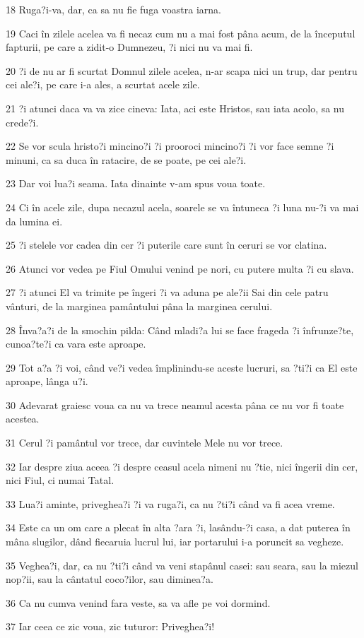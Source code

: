 \par 18 Ruga?i-va, dar, ca sa nu fie fuga voastra iarna.
\par 19 Caci în zilele acelea va fi necaz cum nu a mai fost pâna acum, de la începutul fapturii, pe care a zidit-o Dumnezeu, ?i nici nu va mai fi.
\par 20 ?i de nu ar fi scurtat Domnul zilele acelea, n-ar scapa nici un trup, dar pentru cei ale?i, pe care i-a ales, a scurtat acele zile.
\par 21 ?i atunci daca va va zice cineva: Iata, aci este Hristos, sau iata acolo, sa nu crede?i.
\par 22 Se vor scula hristo?i mincino?i ?i prooroci mincino?i ?i vor face semne ?i minuni, ca sa duca în ratacire, de se poate, pe cei ale?i.
\par 23 Dar voi lua?i seama. Iata dinainte v-am spus voua toate.
\par 24 Ci în acele zile, dupa necazul acela, soarele se va întuneca ?i luna nu-?i va mai da lumina ei.
\par 25 ?i stelele vor cadea din cer ?i puterile care sunt în ceruri se vor clatina.
\par 26 Atunci vor vedea pe Fiul Omului venind pe nori, cu putere multa ?i cu slava.
\par 27 ?i atunci El va trimite pe îngeri ?i va aduna pe ale?ii Sai din cele patru vânturi, de la marginea pamântului pâna la marginea cerului.
\par 28 Înva?a?i de la smochin pilda: Când mladi?a lui se face frageda ?i înfrunze?te, cunoa?te?i ca vara este aproape.
\par 29 Tot a?a ?i voi, când ve?i vedea împlinindu-se aceste lucruri, sa ?ti?i ca El este aproape, lânga u?i.
\par 30 Adevarat graiesc voua ca nu va trece neamul acesta pâna ce nu vor fi toate acestea.
\par 31 Cerul ?i pamântul vor trece, dar cuvintele Mele nu vor trece.
\par 32 Iar despre ziua aceea ?i despre ceasul acela nimeni nu ?tie, nici îngerii din cer, nici Fiul, ci numai Tatal.
\par 33 Lua?i aminte, priveghea?i ?i va ruga?i, ca nu ?ti?i când va fi acea vreme.
\par 34 Este ca un om care a plecat în alta ?ara ?i, lasându-?i casa, a dat puterea în mâna slugilor, dând fiecaruia lucrul lui, iar portarului i-a poruncit sa vegheze.
\par 35 Veghea?i, dar, ca nu ?ti?i când va veni stapânul casei: sau seara, sau la miezul nop?ii, sau la cântatul coco?ilor, sau diminea?a.
\par 36 Ca nu cumva venind fara veste, sa va afle pe voi dormind.
\par 37 Iar ceea ce zic voua, zic tuturor: Priveghea?i!

